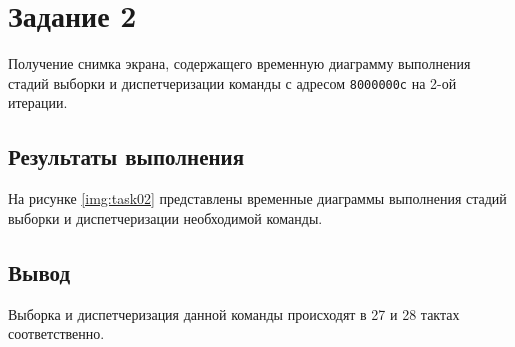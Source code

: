 \chapter{Задание 2}

Получение снимка экрана, содержащего временную диаграмму выполнения стадий
выборки и диспетчеризации команды с адресом \texttt{8000000c} на 2-ой итерации.

\section{Результаты выполнения}

На рисунке \ref{img:task02} представлены временные диаграммы выполнения стадий
выборки и диспетчеризации необходимой команды.


\section{Вывод}

Выборка и диспетчеризация данной команды происходят в 27 и 28 тактах
соответственно.
